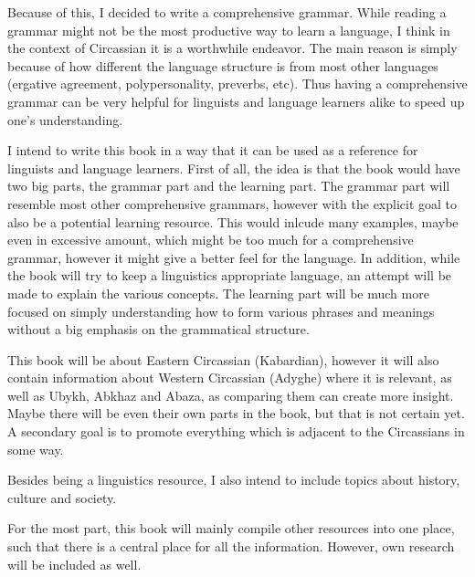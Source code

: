 \documentclass[a4paper, 10pt]{book}
\begin{document}
Because of this, I decided to write a comprehensive grammar. While reading a grammar might not be the most productive way to learn a language, I think in the context of Circassian it is a worthwhile endeavor. The main reason is simply because of how different the language structure is from most other languages (ergative agreement, polypersonality, preverbs, etc). Thus having a comprehensive grammar can be very helpful for linguists and language learners alike to speed up one's understanding.

I intend to write this book in a way that it can be used as a reference for linguists and language learners. First of all, the idea is that the book would have two big parts, the grammar part and the learning part. The grammar part will resemble most other comprehensive grammars, however with the explicit goal to also be a potential learning resource. This would inlcude many examples, maybe even in excessive amount, which might be too much for a  comprehensive grammar, however it might give a better feel for the language. In addition, while the book will try to keep a linguistics appropriate language, an attempt will be made to explain the various concepts. The learning part will be much more focused on simply understanding how to form various phrases and meanings without a big emphasis on the grammatical structure.

This book will be about Eastern Circassian (Kabardian), however it will also contain information about Western Circassian (Adyghe) where it is relevant, as well as Ubykh, Abkhaz and Abaza, as comparing them can create more insight. Maybe there will be even their own parts in the book, but that is not certain yet. A secondary goal is to promote everything which is adjacent to the Circassians in some way.

Besides being a linguistics resource, I also intend to include topics about history, culture and society.

For the most part, this book will mainly compile other resources into one place, such that there is a central place for all the information. However, own research will be included as well.
\end{document}
